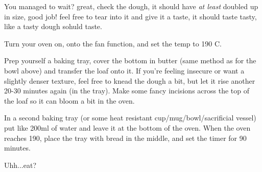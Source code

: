\documentclass[10pt]{article}
\begin{document}
You managed to wait? great, check the dough, it should have \textit{at least} doubled up in size, good job! feel free to tear into it and give it a taste, it should taste tasty, like a tasty dough sohuld taste.\par

Turn your oven on, onto the fan function, and set the temp to 190 C.\par

Prep yourself a baking tray, cover the bottom in butter (same method as for the bowl above) and transfer the loaf onto it. If you're feeling insecure or want a slightly denser texture, feel free to knead the dough a bit, but let it rise another 20-30 minutes again (in the tray). Make some fancy incisions across the top of the loaf so it can bloom a bit in the oven. \par

In a second baking tray (or some heat resistant cup/mug/bowl/sacrificial vessel) put like 200ml of water and leave it at the bottom of the oven. When the oven reaches 190, place the tray with bread in the middle, and set the timer for 90 minutes.\par

Uhh...eat?
\end{document}
